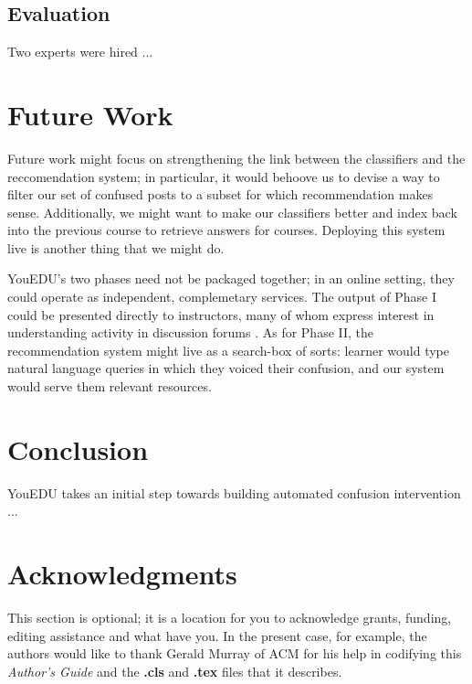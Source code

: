 \documentclass{edm_template}
\begin{document}
\subsection{Evaluation}
Two experts were hired ...

\section{Future Work}
Future work might focus on strengthening the link between the classifiers and the reccomendation system; in particular, it would behoove us to devise a way to filter our set of confused posts to a subset for which recommendation makes sense. Additionally, we might want to make our classifiers better and index back into the previous course to retrieve answers for courses. Deploying this system live is another thing that we might do. 

YouEDU's two phases need not be packaged together; in an online setting, they could operate as independent, complemetary services. The output of Phase I could be presented directly to instructors, many of whom express interest in understanding activity in discussion forums \cite{Stephens-Martinez:2014:MMI:2556325.2566246}. As for Phase II, the recommendation system might live as a search-box of sorts: learner would type natural language queries in which they voiced their confusion, and our system would serve them relevant resources.

\section{Conclusion}
YouEDU takes an initial step towards building automated confusion intervention ... 


\section{Acknowledgments}
This section is optional\cite{wen2014sentiment}; it is a location for you
to acknowledge grants, funding, editing assistance and
what have you.  In the present case, for example, the
authors would like to thank Gerald Murray of ACM for
his help in codifying this \textit{Author's Guide}
and the \textbf{.cls} and \textbf{.tex} files that it describes.

%

%
%
\balancecolumns
\end{document}
